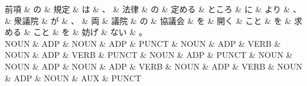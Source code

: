 \documentclass[tikz,border=5pt]{standalone}
\begin{document}
\normalsize
\begin{dependency}[edge unit distance=10.4pt]
    \begin{deptext}[column sep=1em]
        前項 \& の \& 規定 \& は \& 、 \& 法律 \& の \& 定める \& ところ \& に \& より \& 、 \& 衆議院 \& が \& 、 \& 両 \& 議院 \& の \& 協議会 \& を \& 開く \& こと \& を \& 求める \& こと \& を \& 妨げ \& ない \& 。\\
        NOUN \& ADP \& NOUN \& ADP \& PUNCT \& NOUN \& ADP \& VERB \& NOUN \& ADP \& VERB \& PUNCT \& NOUN \& ADP \& PUNCT \& NOUN \& NOUN \& ADP \& NOUN \& ADP \& VERB \& NOUN \& ADP \& VERB \& NOUN \& ADP \& NOUN \& AUX \& PUNCT\\
    \end{deptext}
\end{dependency}
\end{document}
